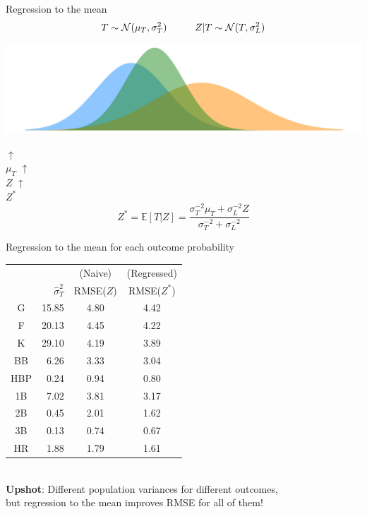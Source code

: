 \documentclass{beamer}
\def\mE{\mathbb E}\def\mN{\mathbb N}\def\mP{\mathbb P}\def\mR{\mathbb R}
\begin{document}
\begin{frame}{Regression to the mean}
$$T \sim \mathcal N(\mu_T, \sigma^2_T) \hspace{1cm}
Z|T \sim \mathcal N(T, \sigma^2_L)$$
\begin{center}
\includegraphics[width = \textwidth]{../figs/talent-skill-post.pdf}
\end{center}
\vspace{-6mm}\tabto*{37mm}$\uparrow$\\
\tabto*{36mm}$\mu_T$
\vspace{-5mm}\tabto*{58mm}$\uparrow$\\
\tabto*{57.5mm}$Z$
\vspace{-4.5mm}\tabto*{44mm}$\uparrow$\\
\tabto*{43mm}$Z^*$\\
$$Z^* = \mE[T|Z] = \frac{\sigma_T^{-2}\mu_T + \sigma_L^{-2}Z}
    {\sigma_T^{-2} + \sigma_L^{-2}}$$
\end{frame}

\begin{frame}{Regression to the mean for each outcome probability}
\centering
\begin{tabular}{c|r|cc}
\multicolumn{2}{c}{}    & (Naive)   & (Regressed)\\
    & $\hat\sigma^2_T$  & RMSE($Z$) & RMSE($Z^*$)\\
    \hline
G   & 15.85             & 4.80      & 4.42\\
F   & 20.13             & 4.45      & 4.22\\
K   & 29.10             & 4.19      & 3.89\\
BB  &  6.26             & 3.33      & 3.04\\
HBP &  0.24             & 0.94      & 0.80\\
1B  &  7.02             & 3.81      & 3.17\\
2B  &  0.45             & 2.01      & 1.62\\
3B  &  0.13             & 0.74      & 0.67\\
HR  &  1.88             & 1.79      & 1.61
\end{tabular}\\
\vspace{1cm}
{\bf Upshot}: Different population variances for different outcomes,\\
but regression to the mean improves RMSE for all of them!
\end{frame}
\end{document}
